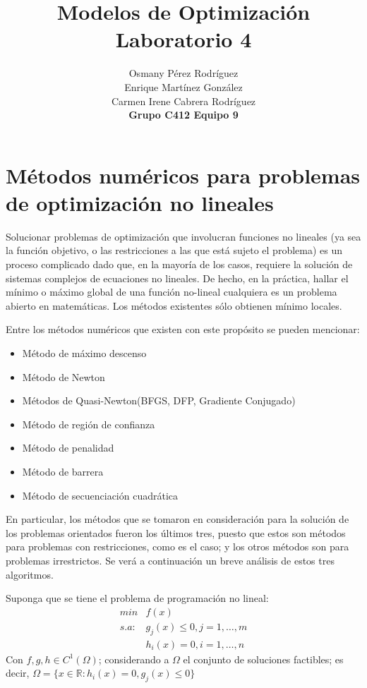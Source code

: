 \documentclass[titlepage, 11pt]{scrartcl}
\title{
    \normalfont\normalsize
    {\huge Modelos de Optimización\\
    		\textbf{Laboratorio 4}}
    \vspace{12pt}
}
\author{Osmany P\'erez Rodr\'iguez\\
		Enrique Mart\'inez Gonz\'alez\\
		Carmen Irene Cabrera Rodr\'iguez\\
		\textbf{Grupo C412 Equipo 9}}
\date{}
\begin{document}
    \maketitle 
    
	\section{Métodos numéricos para problemas de optimización no lineales}    
		
	Solucionar problemas de optimización que involucran funciones no lineales (ya sea la función objetivo, o las restricciones a las que está sujeto el problema) es un proceso complicado dado que, en la mayoría de los casos, requiere la solución de sistemas complejos de ecuaciones no lineales. De hecho, en la práctica, hallar el mínimo o máximo global de una
función no-lineal cualquiera es un problema abierto en matemáticas. Los métodos
existentes sólo obtienen mínimo locales.
	
	Entre los métodos numéricos que existen con este propósito se pueden mencionar:
	\begin{itemize}
		\item Método de máximo descenso
		\item Método de Newton
		\item Métodos de Quasi-Newton(BFGS, DFP, Gradiente Conjugado)
		\item Método de región de confianza
		\item Método de penalidad
		\item Método de barrera
		\item Método de secuenciación cuadrática
	\end{itemize}

	En particular, los métodos que se tomaron en consideración para la solución de los problemas orientados fueron los últimos tres, puesto que estos son métodos para problemas con restricciones, como es el caso; y los otros métodos son para problemas irrestrictos. Se verá a continuación un breve análisis de estos tres algoritmos.
	
	Suponga que se tiene el problema de programación no lineal:
	\begin{align*}
		min  &f(x)\\
		s.a: &g_j(x) \leq 0, j = 1, \ldots , m\\
		&h_i(x) = 0, i = 1, \ldots, n
	\end{align*}
	Con $f, g, h \in C^1(\Omega)$; considerando a $\Omega$ el conjunto de soluciones factibles; es decir, $\Omega = \{x \in \mathbb{R}: h_i(x) = 0 , g_j(x) \leq 0\}$
	
\end{document}
